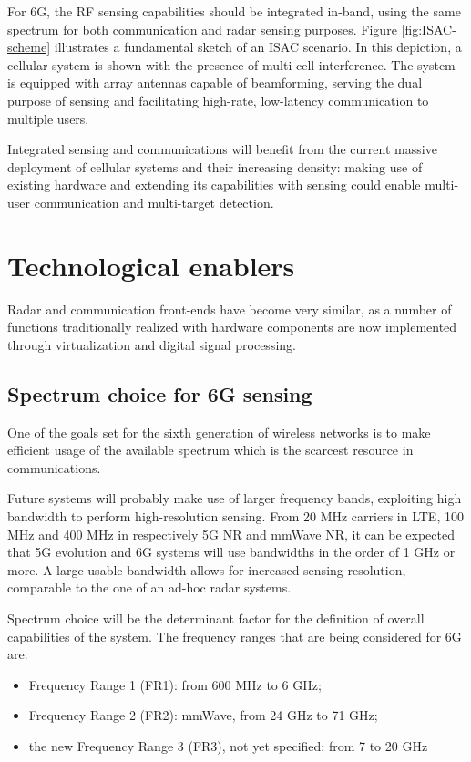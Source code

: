 For 6G, the RF sensing capabilities should be integrated in-band, using the same spectrum for both communication and radar sensing purposes. Figure \ref{fig:ISAC-scheme} illustrates a fundamental sketch of an ISAC scenario. In this depiction, a cellular system is shown with the presence of multi-cell interference. The system is equipped with array antennas capable of beamforming, serving the dual purpose of sensing and facilitating high-rate, low-latency communication to multiple users.

Integrated sensing and communications will benefit from the current massive deployment of cellular systems and their increasing density: making use of existing hardware and extending its capabilities with sensing could enable multi-user communication and multi-target detection.



\section{Technological enablers}
	
	Radar and communication front-ends have become very similar, as a number of functions traditionally realized with hardware components are now implemented through virtualization and digital signal processing.
	
	\subsection{Spectrum choice for 6G sensing}
	
	One of the goals set for the sixth generation of wireless networks is to make efficient usage of the available spectrum which is the scarcest resource in communications.
	
	Future systems will probably make use of larger frequency bands, exploiting high bandwidth to perform high-resolution sensing. From 20 MHz carriers in LTE, 100 MHz and 400 MHz in respectively 5G NR and mmWave NR, it can be expected that 5G evolution and 6G systems will use bandwidths in the order of 1 GHz or more. A large usable bandwidth allows for increased sensing resolution, comparable to the one of an ad-hoc radar systems.
	
	Spectrum choice will be the determinant factor for the definition of overall capabilities of the system. The frequency ranges that are being considered for 6G \cite{Hexa} are:
	
	\begin{itemize}
		\item Frequency Range 1 (FR1): from 600 MHz to 6 GHz;
		\item Frequency Range 2 (FR2): mmWave, from 24 GHz to 71 GHz;
		\item the new Frequency Range 3 (FR3), not yet specified: from 7 to 20 GHz
	\end{itemize}
	
